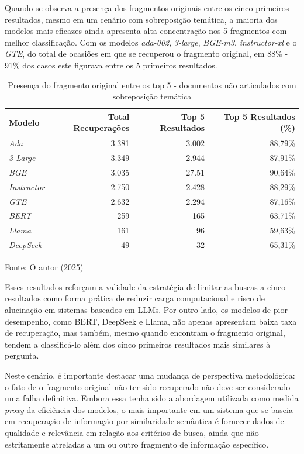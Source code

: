 Quando se observa a presença dos fragmentos originais entre os cinco primeiros resultados, mesmo em um cenário com sobreposição temática, a maioria dos modelos mais eficazes ainda apresenta alta concentração nos 5 fragmentos com melhor classificação. Com os modelos \textit{ada-002}, \textit{3-large}, \textit{BGE-m3}, \textit{instructor-xl} e o \textit{GTE}, do total de ocasiões em que se recuperou o fragmento original, em 88\% - 91\% dos casos este figurava entre os 5 primeiros resultados.


\begin{table}[H]
    \caption{Presença do fragmento original entre os top 5 - documentos não articulados com sobreposição temática}
    \centering
    \begin{tabular}{ l r r r }
        \hline
        \textbf{Modelo} & \textbf{Total Recuperações} & \textbf{Top 5 Resultados} & \textbf{Top 5 Resultados (\%)} \\
        \hline
        \textit{Ada} & 3.381 & 3.002 & 88,79\% \\
        \textit{3-Large} & 3.349 & 2.944 & 87,91\% \\
        \textit{BGE} & 3.035 & 27.51 & 90,64\% \\
        \textit{Instructor} & 2.750 & 2.428 & 88,29\% \\
        \textit{GTE} & 2.632 & 2.294 & 87,16\% \\
        \textit{BERT} & 259 & 165 & 63,71\% \\
        \textit{Llama} & 161 & 96 & 59,63\% \\
        \textit{DeepSeek} & 49 & 32 & 65,31\% \\
    \hline
    \end{tabular}
    
    Fonte: O autor (2025)
    \label{tab:recuperacao-5-top-noticias}
\end{table}

Esses resultados reforçam a validade da estratégia de limitar as buscas a cinco resultados como forma prática de reduzir carga computacional e risco de alucinação em sistemas baseados em \ac{LLM}s. Por outro lado, os modelos de pior desempenho, como BERT, DeepSeek e Llama, não apenas apresentam baixa taxa de recuperação, mas também, mesmo quando encontram o fragmento original, tendem a classificá-lo além dos cinco primeiros resultados mais similares à pergunta.

Neste cenário, é importante destacar uma mudança de perspectiva metodológica: o fato de o fragmento original não ter sido recuperado não deve ser considerado uma falha definitiva. Embora essa tenha sido a abordagem utilizada como medida \textit{proxy} da eficiência dos modelos, o mais importante em um sistema que se baseia em recuperação de informação por similaridade semântica é fornecer dados de qualidade e relevância em relação aos critérios de busca, ainda que não estritamente atreladas a um ou outro fragmento de informação específico.


